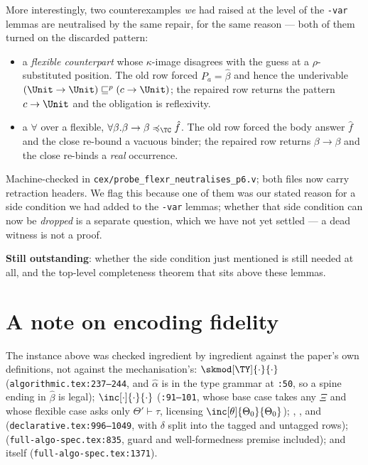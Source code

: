 \documentclass[11pt,a4paper]{article}
\theoremstyle{definition}
\newcommand{\coq}[1]{\texttt{\small #1}}
\begin{document}
More interestingly, two counterexamples \emph{we} had raised at the level
of the \texttt{-var} lemmas are neutralised by the same repair, for the
same reason --- both of them turned on the discarded pattern:
\begin{itemize}\itemsep2pt
\item a \emph{flexible counterpart} whose $\kappa$-image disagrees with the
  guess at a $\rho$-substituted position.  The old row forced
  $P_a = \hat\beta$ and hence the underivable
  $(\Unit\to\Unit)\sqsubseteq^p(c\to\Unit)$; the repaired row returns the
  pattern $c\to\Unit$ and the obligation is reflexivity.
\item a $\forall$ over a flexible, $\forall\beta.\beta\to\beta
  \preccurlyeq_{\TC} \hat f$.  The old row forced the body answer $\hat f$
  and the close re-bound a vacuous binder; the repaired row returns
  $\beta\to\beta$ and the close re-binds a \emph{real} occurrence.
\end{itemize}
Machine-checked in \coq{cex/probe\_flexr\_neutralises\_p6.v}; both files
now carry retraction headers.  We flag this because one of them was our
stated reason for a side condition we had added to the \texttt{-var}
lemmas; whether that side condition can now be \emph{dropped} is a separate
question, which we have not yet settled --- a dead witness is not a proof.

\medskip\noindent
\textbf{Still outstanding}: whether the side condition just mentioned is
still needed at all, and the top-level completeness theorem that sits above
these lemmas.

\section*{A note on encoding fidelity}

The instance above was checked ingredient by ingredient against the
paper's own definitions, not against the mechanisation's:
$\skmod[\TY]{\cdot}{\cdot}$ (\texttt{algorithmic.tex:237--244}, and
$\hat\alpha$ is in the type grammar at \texttt{:50}, so a spine ending
in $\hat\beta$ is legal); $\inc[\cdot]{\cdot}{\cdot}$
(\texttt{:91--101}, whose base case takes any $\Xi$ and whose flexible
case asks only $\Theta'\vdash\tau$, licensing
$\inc[\theta]{\Theta_0}{\Theta_0}$); , ,
 and 
(\texttt{declarative.tex:996--1049}, with $\delta$ split into the tagged
and untagged rows); 
(\texttt{full-algo-spec.tex:835}, guard and well-formedness premise
included); and  itself
(\texttt{full-algo-spec.tex:1371}).
\end{document}

